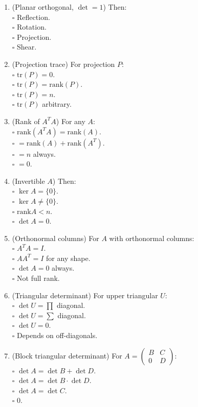 \documentclass[11pt]{article}
\begin{document}
\begin{enumerate}
\item (Planar orthogonal, $\det=1$) Then:\\
\(\square\) Reflection.\\
\(\square\) Rotation.\\
\(\square\) Projection.\\
\(\square\) Shear.

\item (Projection trace) For projection $P$:\\
\(\square\) $\mathrm{tr}(P)=0$.\\
\(\square\) $\mathrm{tr}(P)=\mathrm{rank}(P)$.\\
\(\square\) $\mathrm{tr}(P)=n$.\\
\(\square\) $\mathrm{tr}(P)$ arbitrary.

\item (Rank of $A^TA$) For any $A$:\\
\(\square\) $\mathrm{rank}(A^TA)=\mathrm{rank}(A)$.\\
\(\square\) $=\mathrm{rank}(A)+\mathrm{rank}(A^T)$.\\
\(\square\) $=n$ always.\\
\(\square\) $=0$.

\item (Invertible $A$) Then:\\
\(\square\) $\ker A=\{0\}$.\\
\(\square\) $\ker A\neq\{0\}$.\\
\(\square\) $\mathrm{rank}A<n$.\\
\(\square\) $\det A=0$.

\item (Orthonormal columns) For $A$ with orthonormal columns:\\
\(\square\) $A^TA=I$.\\
\(\square\) $AA^T=I$ for any shape.\\
\(\square\) $\det A=0$ always.\\
\(\square\) Not full rank.

\item (Triangular determinant) For upper triangular $U$:\\
\(\square\) $\det U = \prod$ diagonal.\\
\(\square\) $\det U = \sum$ diagonal.\\
\(\square\) $\det U = 0$.\\
\(\square\) Depends on off-diagonals.

\item (Block triangular determinant) For $A=\begin{pmatrix}B&C\\0&D\end{pmatrix}$:\\
\(\square\) $\det A=\det B+\det D$.\\
\(\square\) $\det A=\det B\cdot\det D$.\\
\(\square\) $\det A=\det C$.\\
\(\square\) $0$.


\end{enumerate}
\end{document}
